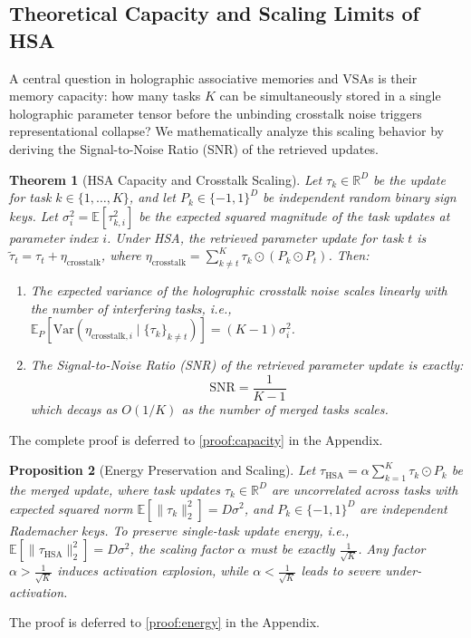 \documentclass{article}
\theoremstyle{plain}
\newtheorem{theorem}{Theorem}[section]
\newtheorem{proposition}[theorem]{Proposition}
\theoremstyle{definition}
\theoremstyle{remark}
\begin{document}
\subsection{Theoretical Capacity and Scaling Limits of HSA}
\label{subsec:capacity_theory}
A central question in holographic associative memories and VSAs is their memory capacity: how many tasks $K$ can be simultaneously stored in a single holographic parameter tensor before the unbinding crosstalk noise triggers representational collapse? We mathematically analyze this scaling behavior by deriving the Signal-to-Noise Ratio (SNR) of the retrieved updates.

\begin{theorem}[HSA Capacity and Crosstalk Scaling]
Let $\tau_k \in \mathbb{R}^D$ be the update for task $k \in \{1, \dots, K\}$, and let $P_k \in \{-1, 1\}^D$ be independent random binary sign keys. Let $\sigma_i^2 = \mathbb{E}[\tau_{k,i}^2]$ be the expected squared magnitude of the task updates at parameter index $i$. Under HSA, the retrieved parameter update for task $t$ is $\tilde{\tau}_{t} = \tau_t + \eta_{\text{crosstalk}}$, where $\eta_{\text{crosstalk}} = \sum_{k \neq t}^K \tau_k \odot (P_k \odot P_t)$. Then:
\begin{enumerate}
    \item The expected variance of the holographic crosstalk noise scales linearly with the number of interfering tasks, i.e., $\mathbb{E}_{P}[\text{Var}(\eta_{\text{crosstalk}, i} \mid \{\tau_k\}_{k \neq t})] = (K-1)\sigma_i^2$.
    \item The Signal-to-Noise Ratio (SNR) of the retrieved parameter update is exactly:
    \begin{equation}
        \text{SNR} = \frac{1}{K-1}
    \end{equation}
    which decays as $O(1/K)$ as the number of merged tasks scales.
\end{enumerate}
\end{theorem}
The complete proof is deferred to \cref{proof:capacity} in the Appendix.

\begin{proposition}[Energy Preservation and Scaling]
\label{prop:energy_preservation}
Let $\tau_{\text{HSA}} = \alpha \sum_{k=1}^K \tau_k \odot P_k$ be the merged update, where task updates $\tau_k \in \mathbb{R}^D$ are uncorrelated across tasks with expected squared norm $\mathbb{E}[\|\tau_k\|_2^2] = D\sigma^2$, and $P_k \in \{-1, 1\}^D$ are independent Rademacher keys. To preserve single-task update energy, i.e., $\mathbb{E}[\|\tau_{\text{HSA}}\|_2^2] = D\sigma^2$, the scaling factor $\alpha$ must be exactly $\frac{1}{\sqrt{K}}$. Any factor $\alpha > \frac{1}{\sqrt{K}}$ induces activation explosion, while $\alpha < \frac{1}{\sqrt{K}}$ leads to severe under-activation.
\end{proposition}
The proof is deferred to \cref{proof:energy} in the Appendix.
\end{document}
